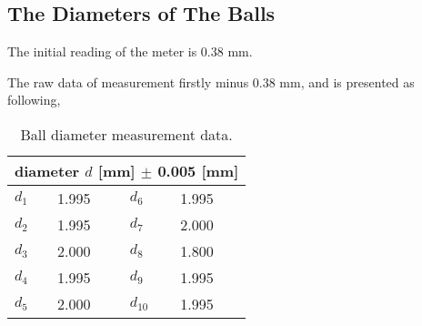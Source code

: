 \subsection{The Diameters of The Balls}

The initial reading of the meter is 0.38 mm.

The raw data of measurement firstly minus 0.38 mm, and is presented as following,

\begin{table}[H]
  \centering
  \begin{tabular}{|p{2cm}|p{3cm}||p{2cm} |p{3cm} |}
    \hline
    \multicolumn{4}{|c|}{diameter $d$ [mm] $\pm$ 0.005 [mm]  } \\
    \hline
    $d_1$ & 1.995 & $d_6$ & 1.995 \\ 
    \hline
    $d_2$ & 1.995 & $d_7$ & 2.000 \\ 
    \hline
    $d_3$ & 2.000 & $d_8$ & 1.800 \\ 
    \hline
    $d_4$ & 1.995 & $d_9$ & 1.995 \\ 
    \hline
    $d_5$ & 2.000 & $d_{10}$ & 1.995 \\ 
    \hline
  \end{tabular}
  \caption{Ball diameter measurement data.}
\end{table}




